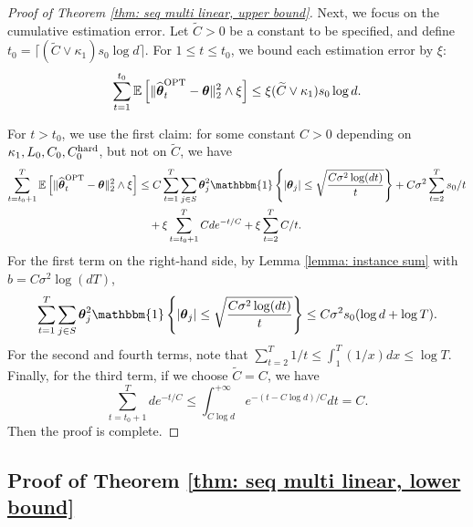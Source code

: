 \documentclass[aos,preprint]{imsart}
\theoremstyle{plain}
\theoremstyle{definition}
\newcommand{\btheta}{\boldsymbol{\theta}}
\newcommand{\idf}{\mathbbm{1}}
\newcommand{\ptheta}{\widehat{\boldsymbol{\theta}}^{\textup{OPT}}}
\newcommand{\Exp}{\mathbb{E}}
\begin{document}
\begin{appendix}
\begin{proof}[Proof of Theorem \ref{thm: seq multi linear, upper bound}]
Next, we focus on the cumulative estimation error. Let $\widetilde{C} > 0$ be a constant to be specified, and define $t_0 = \lceil(\widetilde{C}\vee\kappa_1) s_0\log d\rceil$.  For $1 \leq t \leq t_0$, we bound each estimation error by $\xi$:
\begin{equation*} 
    \sum_{t=1}^{t_0} \Exp\left[\|\ptheta_t-\btheta \|_2^2\wedge \xi\right]  \le \xi (\widetilde{C}\vee\kappa_1) s_0\log d.
\end{equation*}

For $t > t_0$, we use the first claim: for some constant $C > 0$ depending on $\kappa_1, L_0, C_0, C_0^{\textup{hard}}$, but not on $\widetilde{C}$, we have
\begin{equation*} 
\begin{aligned}
    \sum_{t=t_0+1}^T \Exp\left[\|\ptheta_t-\btheta \|_2^2 \wedge \xi\right] &\le C \sum_{t=1}^T \sum_{j\in S} \btheta_j^2 \idf\left\{|\btheta_j| \le \sqrt{\frac{C\sigma^2\log (dt)}{t}} \right\} + C\sigma^2 \sum_{t=2}^{T}s_0/t
    \\&\quad + \xi \sum_{t=t_0+1}^T Cde^{-t/C} + \xi \sum_{t=2}^T C/t. 
\end{aligned}
\end{equation*}
For the first term on the right-hand side, by Lemma \ref{lemma: instance sum} with $b = C \sigma^2\log(dT)$,
\begin{equation*}
    \sum_{t=1}^T \sum_{j\in S} \btheta_j^2 \idf\left\{|\btheta_j| \le \sqrt{\frac{C\sigma^2\log (dt)}{t}} \right\} \le C\sigma^2 s_0(\log d + \log T).
\end{equation*}
For the second and fourth terms, note that $\sum_{t=2}^T 1/t \le \int_1^T (1/x) dx\le \log T$. Finally, for the third term, if we choose $\widetilde{C} = C$, we have
$$
\sum_{t=t_0+1}^T de^{-t/C} \le \int_{C\log d}^{+\infty} e^{-(t-C\log d)/C} dt = C.
$$ 
Then the proof is complete.

\end{proof}


\subsection{Proof of Theorem \ref{thm: seq multi linear, lower bound}} \label{sec: proof of seq multi linear, lower bound}


\end{appendix}
\end{document}

